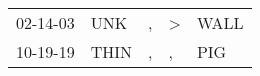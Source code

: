 \begin{supertabular}{lllll}
 02-14-03 &   UNK &  , &  \textgreater &  WALL \\
 10-19-19 &  THIN &  , &             , &   PIG \\
\end{supertabular}
